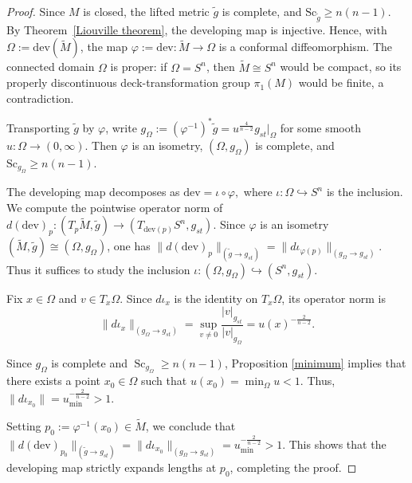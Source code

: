 \documentclass[12pt,oneside,a4paper]{article}
\theoremstyle{mytheorem}
\theoremstyle{remark}
\theoremstyle{definition}
\begin{document}
\begin{proof}
Since \(M\) is closed, the lifted metric \(\tilde g\) is complete, and
$\mathrm{Sc}_{\tilde g}\geq n(n-1)$. By
Theorem~\ref{Liouville theorem}, the developing map is injective. Hence, with
\(\Omega:=\mathrm{dev}(\widetilde M)\), the map
\(\varphi:=\mathrm{dev}\colon\widetilde M\to\Omega\)
is a conformal diffeomorphism. The connected domain \(\Omega\) is proper:
if \(\Omega=S^n\), then \(\widetilde M\cong S^n\) would be compact, so its
properly discontinuous deck-transformation group
\(\pi_1(M)\) would be finite, a contradiction.

Transporting \(\tilde g\) by \(\varphi\), write
\(g_{\Omega}:=(\varphi^{-1})^*\tilde g
=u^{\frac{4}{n-2}}g_{st}\big|_{\Omega}\)
for some smooth \(u\colon\Omega\to(0,\infty)\). Then \(\varphi\) is an
isometry, \((\Omega,g_{\Omega})\) is complete, and
\(\mathrm{Sc}_{g_{\Omega}}\geq n(n-1)\).



The developing map decomposes as $\mathrm{dev} = \iota \circ \varphi,$
where $\iota:\Omega \hookrightarrow S^{n}$ is the inclusion. We compute the pointwise operator norm of 
$d(\mathrm{dev})_{p} : (T_{p}\widetilde{M},\tilde{g}) \to (T_{\mathrm{dev}(p)} S^{n}, g_{st}).$ Since $\varphi$ is an isometry $(\widetilde{M},\tilde{g})\cong(\Omega,g_{\Omega})$, one has $\| d(\mathrm{dev})_{p} \|_{(\tilde{g}\to g_{st})}
=\| d\iota_{\varphi(p)} \|_{(g_{\Omega}\to g_{st})}.$ Thus it suffices to study the inclusion $\iota : (\Omega, g_{\Omega}) \hookrightarrow (S^{n}, g_{st}).$

Fix $x\in \Omega$ and $v\in T_{x}\Omega$. Since $d\iota_{x}$ is the identity on $T_{x}\Omega$, its operator norm is
\[
\| d\iota_{x} \|_{(g_{\Omega}\to g_{st})}
=
\sup_{v\neq 0}
\frac{|v|_{g_{st}}}{|v|_{g_{\Omega}}}
=
u(x)^{-\frac{2}{n-2}}.
\]

Since $g_{\Omega}$ is complete and $\operatorname{Sc}_{g_{\Omega}} \ge n(n-1)$,  Proposition \ref{minimum} implies that there exists a point $x_0\in \Omega$ such that $u(x_0)=\min_{\Omega} u < 1$. Thus, 
$\| d\iota_{x_{0}} \|=u_{\min}^{-\frac{2}{n-2}}> 1.$


Setting $p_{0} := \varphi^{-1}(x_{0}) \in \widetilde{M}$, we conclude that
$\| d(\mathrm{dev})_{p_{0}} \|_{(\tilde{g}\to g_{st})}
=
\| d\iota_{x_{0}} \|_{(g_{\Omega}\to g_{st})}
=
u_{\min}^{-\frac{2}{n-2}}
> 1$.
This shows that the developing map strictly expands lengths at $p_{0}$, completing the proof.

\end{proof}
\end{document}
